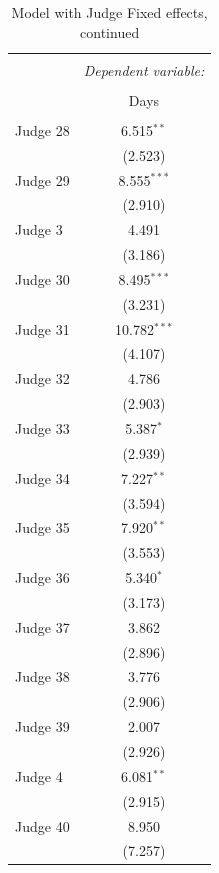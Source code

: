 \documentclass[11pt]{article}
\begin{document}
    \begin{table}[H] \centering
      \caption{Model with Judge Fixed effects, continued}
      \small
      \begin{tabular}{@{\extracolsep{5pt}}lc}
      \\[-1.8ex]\hline
      \hline \\[-1.8ex]
       & \multicolumn{1}{c}{\textit{Dependent variable:}} \\
      \cline{2-2}
      \\[-1.8ex] & Days \\
      \hline \\[-1.8ex]
        Judge 28 & 6.515$^{**}$ \\
        & (2.523) \\
        Judge 29 & 8.555$^{***}$ \\
        & (2.910) \\
        Judge 3 & 4.491 \\
        & (3.186) \\
        Judge 30 & 8.495$^{***}$ \\
        & (3.231) \\
        Judge 31 & 10.782$^{***}$ \\
        & (4.107) \\
        Judge 32 & 4.786 \\
        & (2.903) \\
        Judge 33 & 5.387$^{*}$ \\
        & (2.939) \\
        Judge 34 & 7.227$^{**}$ \\
        & (3.594) \\
        Judge 35 & 7.920$^{**}$ \\
        & (3.553) \\
        Judge 36 & 5.340$^{*}$ \\
        & (3.173) \\
        Judge 37 & 3.862 \\
        & (2.896) \\
        Judge 38 & 3.776 \\
        & (2.906) \\
        Judge 39 & 2.007 \\
        & (2.926) \\
        Judge 4 & 6.081$^{**}$ \\
        & (2.915) \\
        Judge 40 & 8.950 \\
        & (7.257) \\

\end{tabular}
\end{table}
\end{document}
